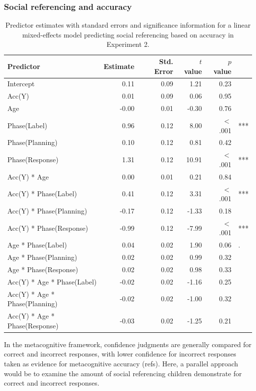 \documentclass[a4paper,man,apacite,floatsintext]{apa6}
\begin{document}
\subsubsection{Social referencing and
accuracy}\label{social-referencing-and-accuracy}

\begin{table}[tb]
\centering
\begin{tabular}{lrrrrl}
 Predictor & Estimate & Std. Error & $t$ value & $p$ value &  \\ 
  \hline
Intercept & 0.11 & 0.09 & 1.21 & 0.23 &  \\ 
  Acc(Y) & 0.01 & 0.09 & 0.06 & 0.95 &  \\ 
  Age & -0.00 & 0.01 & -0.30 & 0.76 &  \\ 
  Phase(Label) & 0.96 & 0.12 & 8.00 & $<$ .001 & *** \\ 
  Phase(Planning) & 0.10 & 0.12 & 0.81 & 0.42 &  \\ 
  Phase(Response) & 1.31 & 0.12 & 10.91 & $<$ .001 & *** \\ 
  Acc(Y) * Age & 0.00 & 0.01 & 0.21 & 0.84 &  \\ 
  Acc(Y) * Phase(Label) & 0.41 & 0.12 & 3.31 & $<$ .001 & *** \\ 
  Acc(Y) * Phase(Planning) & -0.17 & 0.12 & -1.33 & 0.18 &  \\ 
  Acc(Y) * Phase(Response) & -0.99 & 0.12 & -7.99 & $<$ .001 & *** \\ 
  Age * Phase(Label) & 0.04 & 0.02 & 1.90 & 0.06 & . \\ 
  Age * Phase(Planning) & 0.02 & 0.02 & 0.99 & 0.32 &  \\ 
  Age * Phase(Response) & 0.02 & 0.02 & 0.98 & 0.33 &  \\ 
  Acc(Y) * Age * Phase(Label) & -0.02 & 0.02 & -1.16 & 0.25 &  \\ 
  Acc(Y) * Age * Phase(Planning) & -0.02 & 0.02 & -1.00 & 0.32 &  \\ 
  Acc(Y) * Age * Phase(Response) & -0.03 & 0.02 & -1.25 & 0.21 &  \\ 
   \hline
\end{tabular}
\caption{Predictor estimates with standard errors and significance information for a linear mixed-effects model predicting social referencing based on accuracy in Experiment 2.} 
\label{tab:exp2acc_reg}
\end{table}

In the metacognitive framework, confidence judgments are generally
compared for correct and incorrect responses, with lower confidence for
incorrect responses taken as evidence for metacognitive accuracy (refs).
Here, a parallel approach would be to examine the amount of social
referencing children demonstrate for correct and incorrect responses.
\end{document}
